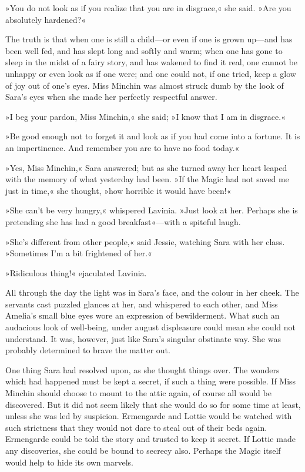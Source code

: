 »You do not look as if you realize that you are in disgrace,« she said. »Are you absolutely hardened?«

The truth is that when one is still a child—or even if one is grown up—and has been well fed, and has slept long and softly and warm; when one has gone to sleep in the midst of a fairy story, and has wakened to find it real, one cannot be unhappy or even look as if one were; and one could not, if one tried, keep a glow of joy out of one's eyes. Miss Minchin was almost struck dumb by the look of Sara's eyes when she made her perfectly respectful answer.

»I beg your pardon, Miss Minchin,« she said; »I know that I am in disgrace.«

»Be good enough not to forget it and look as if you had come into a fortune. It is an impertinence. And remember you are to have no food today.«

»Yes, Miss Minchin,« Sara answered; but as she turned away her heart leaped with the memory of what yesterday had been. »If the Magic had not saved me just in time,« she thought, »how horrible it would have been!«

»She can't be very hungry,« whispered Lavinia. »Just look at her. Perhaps she is pretending she has had a good breakfast«—with a spiteful laugh.

»She's different from other people,« said Jessie, watching Sara with her class. »Sometimes I'm a bit frightened of her.«

»Ridiculous thing!« ejaculated Lavinia.

All through the day the light was in Sara's face, and the colour in her cheek. The servants cast puzzled glances at her, and whispered to each other, and Miss Amelia's small blue eyes wore an expression of bewilderment. What such an audacious look of well-being, under august displeasure could mean she could not understand. It was, however, just like Sara's singular obstinate way. She was probably determined to brave the matter out.

One thing Sara had resolved upon, as she thought things over. The wonders which had happened must be kept a secret, if such a thing were possible. If Miss Minchin should choose to mount to the attic again, of course all would be discovered. But it did not seem likely that she would do so for some time at least, unless she was led by suspicion. Ermengarde and Lottie would be watched with such strictness that they would not dare to steal out of their beds again. Ermengarde could be told the story and trusted to keep it secret. If Lottie made any discoveries, she could be bound to secrecy also. Perhaps the Magic itself would help to hide its own marvels.

